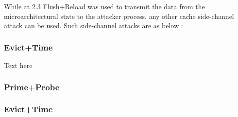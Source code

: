 \documentclass[sigconf]{acmart}
\begin{document}
While at 2.3 Flush+Reload was used to transmit the data from the microarchitectural state to the attacker process, any other cache side-channel attack can be used. Such side-channel attacks are as below : \cite{8686667}

\subsubsection{Evict+Time}

Text here

\subsubsection{Prime+Probe}

\subsubsection{Evict+Time}

\newpage



\appendix
\end{document}
